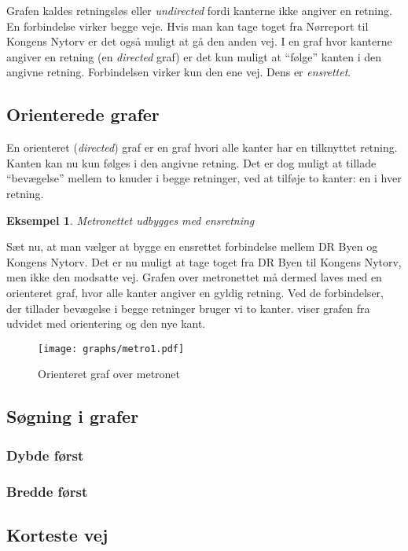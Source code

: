 \documentclass[10pt,a4paper,danish]{article}
\newtheorem{example}{Eksempel}[subsection]
\begin{document}
Grafen kaldes retningsløs eller \textit{undirected} fordi kanterne
ikke angiver en retning. En forbindelse virker begge veje. Hvis man
kan tage toget fra Nørreport til Kongens Nytorv er det også muligt at
gå den anden vej. I en graf hvor kanterne angiver en retning (en
\textit{directed} graf) er det kun muligt at "`følge"' kanten i den
angivne retning. Forbindelsen virker kun den ene vej. Dens er
\textit{ensrettet}.

\subsection{Orienterede grafer}
En orienteret (\textit{directed}) graf er en graf hvori alle kanter
har en tilknyttet retning. Kanten kan nu kun følges i den angivne
retning. Det er dog muligt at tillade "`bevægelse"' mellem to knuder i
begge retninger, ved at tilføje to kanter: en i hver retning.

\begin{example}Metronettet udbygges med ensretning\end{example} Sæt
nu, at man vælger at bygge en ensrettet forbindelse mellem DR Byen og
Kongens Nytorv. Det er nu muligt at tage toget fra DR Byen til Kongens
Nytorv, men ikke den modsatte vej. Grafen over metronettet må dermed
laves med en orienteret graf, hvor alle kanter angiver en gyldig
retning. Ved de forbindelser, der tillader bevægelse i begge retninger
bruger vi to kanter.  viser grafen fra
 udvidet med orientering og den nye kant.
\begin{figure}[h]
\centering
\texttt{[image: graphs/metro1.pdf]}
\caption{Orienteret graf over metronet}
\label{fig:metro1}
\end{figure}


\subsection{Søgning i grafer}
\subsubsection{Dybde først}
\subsubsection{Bredde først}
\subsection{Korteste vej}
\end{document}

